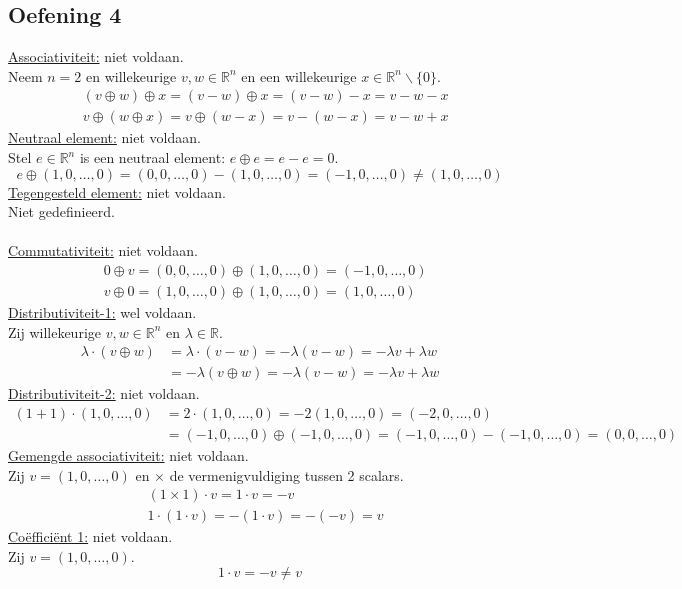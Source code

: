 \documentclass[lineaire_algebra_oplossingen.tex]{subfiles}
\begin{document}
\subsection{Oefening 4}
\underline{Associativiteit:} niet voldaan.\\
Neem $n=2$ en willekeurige $v,w \in \mathbb{R}^n$ en een willekeurige $x \in \mathbb{R}^n\backslash\{0\}$.
\begin{align*}
& (v \oplus w) \oplus x = (v-w) \oplus x = (v - w) - x = v - w - x \\
& v \oplus (w \oplus x) = v \oplus (w-x) = v - (w-x) = v - w + x
\end{align*}
\underline{Neutraal element:} niet voldaan.\\
Stel $e \in \mathbb{R}^n$ is een neutraal element: $e \oplus e = e-e = 0$.
\[
e \oplus (1,0,\ldots,0)
= (0,0,\ldots,0) - (1,0,\ldots,0) = (-1,0,\ldots,0)
\neq (1,0,\ldots,0)
\]
\underline{Tegengesteld element:} niet voldaan.\\
Niet gedefinieerd.\\\\
\underline{Commutativiteit:} niet voldaan.
\begin{align*}
&0 \oplus v
= (0,0,\ldots,0) \oplus (1,0,\ldots,0) = (-1,0,\ldots,0) \\
&v \oplus 0
= (1,0,\ldots,0) \oplus (1,0,\ldots,0) = (1,0,\ldots,0)
\end{align*}
\underline{Distributiviteit-1:} wel voldaan.\\
Zij willekeurige $v,w \in \mathbb{R}^n$ en $\lambda \in \mathbb{R}$.
\begin{align*}
\lambda \cdot (v \oplus w)
&= \lambda \cdot (v-w) = -\lambda(v-w) = -\lambda v + \lambda w \\
&= -\lambda(v \oplus w) = -\lambda(v-w) = -\lambda v + \lambda w
\end{align*}
\underline{Distributiviteit-2:} niet voldaan.
\begin{align*}
(1+1) \cdot (1,0,\ldots,0)
&= 2 \cdot (1,0,\ldots,0) = -2 (1,0,\ldots,0) = (-2,0,\ldots,0) \\
&= (-1,0,\ldots,0) \oplus (-1,0,\ldots,0) = (-1,0,\ldots,0) - (-1,0,\ldots,0) = (0,0,\ldots,0)
\end{align*}
\underline{Gemengde associativiteit:} niet voldaan.\\
Zij $v = (1,0,\ldots,0)$ en $\times$ de vermenigvuldiging tussen 2 scalars.
\begin{align*}
&(1 \times 1) \cdot v = 1 \cdot v = -v \\
&1 \cdot (1 \cdot v) = - (1 \cdot v) = -(-v) = v
\end{align*}
\underline{Co\"effici\"ent 1:} niet voldaan.\\
Zij $v = (1,0,\ldots,0)$.
\[
1 \cdot v = -v \neq v
\]
\end{document}
